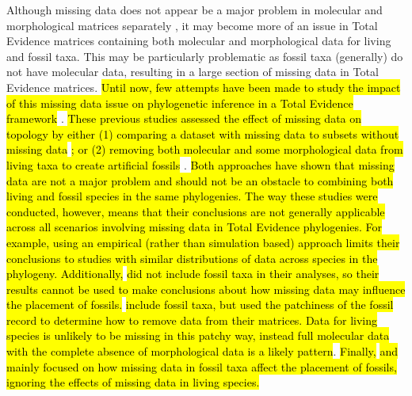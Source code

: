 \documentclass[12pt,letterpaper]{article}
\begin{document}
Although missing data does not appear be a major problem in molecular and morphological matrices separately \citep[\hl{as long as enough data overlaps in each case, and missing data are not phylogeneticaly biased;}][]{wiensmissing2003,Wiens01102005,wiensmissing2006,wiensmissing2008,lemmonthe2009,Sanderson22072011,rouresite-specific2011,pattinsonphylogeny2014}, it may become more of an issue in Total Evidence matrices containing both molecular and morphological data for living and fossil taxa.
This may be particularly problematic as fossil taxa (generally) do not have molecular data, resulting in a large section of missing data in Total Evidence matrices.
\hl{Until now, few attempts have been made to study the impact of this missing data issue on phylogenetic inference in a Total Evidence framework }\citep[\hl{i.e. using both molecular and morphological data;}][]{Wiens01102005,manosphylogeny2007,pattinsonphylogeny2014}.
\hl{These previous studies assessed the effect of missing data on topology by either (1) comparing a dataset with missing data to subsets without missing data }\citep{Wiens01102005}\hl{; or (2) removing both molecular and some morphological data from living taxa to create artificial fossils }\citep{manosphylogeny2007,pattinsonphylogeny2014}.
\hl{Both approaches have shown that missing data are not a major problem and should not be an obstacle to combining both living and fossil species in the same phylogenies.
The way these studies were conducted, however, means that their conclusions are not generally applicable across all scenarios involving missing data in Total Evidence phylogenies.
For example, using an empirical (rather than simulation based) approach limits their conclusions to studies with similar distributions of data across species in the phylogeny.
Additionally, }\cite{Wiens01102005}\hl{ did not include fossil taxa in their analyses, so their results cannot be used to make conclusions about how missing data may influence the placement of fossils.}
\cite{manosphylogeny2007,pattinsonphylogeny2014}\hl{ include fossil taxa, but used the patchiness of the fossil record to determine how to remove data from their matrices. 
Data for living species is unlikely to be missing in this patchy way, instead full molecular data with the complete absence of morphological data is a likely pattern}\citep{GuillermeCooperMissing}.
\hl{Finally, }\cite{manosphylogeny2007}\hl{ and }\cite{pattinsonphylogeny2014}\hl{ mainly focused on how missing data in fossil taxa affect the placement of fossils, ignoring the effects of missing data in living species.}
\end{document}
